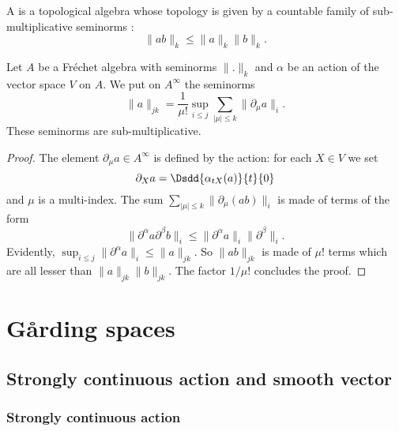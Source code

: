 \begin{definition}
A  is a topological algebra whose topology is given by a countable family of sub-multiplicative seminorms :
\[ 
  \| ab \|_k\leq \| a \|_k\| b \|_k.
\]

\end{definition}

\begin{proposition}
Let $A$ be a Fréchet algebra with seminorms $\| . \|_k$ and $\alpha$ be an action of the vector space $V$ on $A$. We put on $A^{\infty}$ the seminorms
\begin{equation}
  \| a \|_{jk}=\frac{1}{ \mu! }\sup_{i\leq j}\sum_{| \mu |\leq k}\| \partial_{\mu}a \|_i.
\end{equation}
These seminorms are sub-multiplicative.

\end{proposition}

\begin{proof}
The element $\partial_{\mu}a\in A^{\infty}$ is defined by the action: for each $X\in V$ we set
\[ 
  \partial_X a=\Dsdd{ \alpha_{tX}(a) }{t}{0}
\]
and $\mu$ is a multi-index. The sum $\sum_{| \mu |\leq k}\| \partial_{\mu}(ab) \|_{i}$ is made of terms of the form
\[ 
  \| \partial^{\alpha}a\partial^{\beta}b \|_i\leq\| \partial^{\alpha}a \|_i\| \partial^{\beta} \|_i.
\]
Evidently, $\sup_{i\leq j}\| \partial^{\alpha}a \|_i\leq \| a \|_{jk}$. So $\| ab \|_{jk}$ is made of $\mu !$ terms which are all lesser than $\| a \|_{jk}\| b \|_{jk}$. The factor $1/\mu!$ concludes the proof.

\end{proof}
%
   \section{G\r arding spaces}
%

\subsection{Strongly continuous action and smooth vector}  \label{subsec:actionrn}

\subsubsection{Strongly continuous action}

